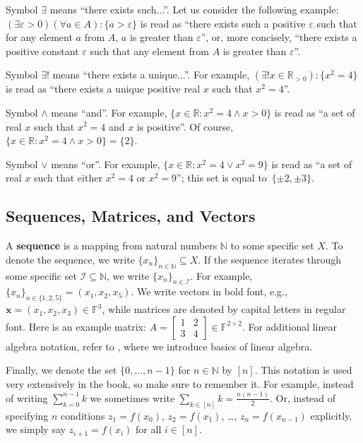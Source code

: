 \documentclass[../../book.tex]{subfiles}
\begin{document}
Symbol $\exists$ means ``there exists such...''. Let us consider the following example: 
$(\exists \varepsilon > 0) (\forall a \in A): \{a > \varepsilon\}$ is read as ``there exists such a positive $\varepsilon$ such 
that for any element $a$ from $A$, $a$ is greater than $\varepsilon$'', or, more concisely, ``there exists a positive constant 
$\varepsilon$ such that any element from $A$ is greater than $\varepsilon$''.

Symbol $\exists !$ means ``there exists a unique...''. For example, $(\exists! x \in \mathbb{R}_{>0}): \{x^2 = 4\}$ 
is read as ``there exists a unique positive real $x$ such that $x^2 = 4$''.

Symbol $\wedge$ means ``and''. For example, $\{x \in \mathbb{R}: x^2 = 4 \wedge x > 0\}$ is read as ``a set of real $x$ such that 
$x^2=4$ and $x$ is positive''. Of course, $\{x \in \mathbb{R}: x^2 = 4 \wedge x > 0\} = \{2\}$.

Symbol $\vee$ means ``or''. For example, $\{x \in \mathbb{R}: x^2 = 4 \vee x^2 = 9\}$ is read as ``a set of real $x$ such that 
either $x^2=4$ or $x^2=9$''; this set is equal to~$\{\pm 2, \pm 3\}$.

\subsection{Sequences, Matrices, and Vectors}

A \textbf{sequence} is a mapping from natural numbers $\mathbb{N}$ to some
specific set $X$. To denote the sequence, we write $\{x_n\}_{n \in \mathbb{N}}
\subseteq X$. If the sequence iterates through some specific set $\mathcal{I}
\subseteq \mathbb{N}$, we write $\{x_n\}_{n \in \mathcal{I}}$. For example,
$\{x_n\}_{n \in \{1,2,5\}} = (x_1, x_2, x_5)$. We write vectors in bold font,
e.g., $\mathbf{x} = (x_1, x_2, x_3) \in \mathbb{F}^3$, while matrices are
denoted by capital letters in regular font. Here is an example matrix: $A =
\begin{bmatrix} 1 & 2 \\ 3 & 4 \end{bmatrix} \in \mathbb{F}^{2 \times 2}$. For
additional linear algebra notation, refer to ,
where we introduce basics of linear algebra.

Finally, we denote the set $\{0,\dots,n-1\}$ for $n \in \mathbb{N}$ by $[n]$.
This notation is used very extensively in the book, so make sure to remember it.
For example, instead of writing $\sum_{k=0}^{n-1}k$ we sometimes write $\sum_{k
\in [n]}k = \frac{n(n-1)}{2}$. Or, instead of specifying $n$ conditions
$z_1=f(x_0)$, $z_2=f(x_1)$, \dots, $z_n=f(x_{n-1})$ explicitly, we simply say
$z_{i+1} = f(x_i)$ for all $i \in [n]$.
\end{document}
